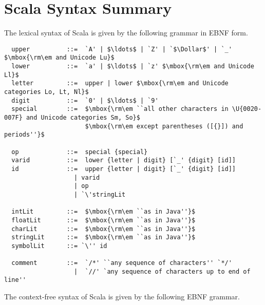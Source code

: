 \appendix
\chapter{Scala Syntax Summary}

The lexical syntax of Scala is given by the following grammar in EBNF
form.

\begin{lstlisting}
  upper          ::=  `A' | $\ldots$ | `Z' | `$\Dollar$' | `_' $\mbox{\rm\em and Unicode Lu}$
  lower          ::=  `a' | $\ldots$ | `z' $\mbox{\rm\em and Unicode Ll}$
  letter         ::=  upper | lower $\mbox{\rm\em and Unicode categories Lo, Lt, Nl}$
  digit          ::=  `0' | $\ldots$ | `9'
  special        ::=  $\mbox{\rm\em ``all other characters in \U{0020-007F} and Unicode categories Sm, So}$
                      $\mbox{\rm\em except parentheses ([{}]) and periods''}$

  op             ::=  special {special} 
  varid          ::=  lower {letter | digit} [`_' {digit} [id]]
  id             ::=  upper {letter | digit} [`_' {digit} [id]]
                   | varid
                   | op
                   | `\'stringLit

  intLit         ::=  $\mbox{\rm\em ``as in Java''}$
  floatLit       ::=  $\mbox{\rm\em ``as in Java''}$
  charLit        ::=  $\mbox{\rm\em ``as in Java''}$
  stringLit      ::=  $\mbox{\rm\em ``as in Java''}$
  symbolLit      ::= `\'' id

  comment        ::=  `/*' ``any sequence of characters'' `*/'
                   |  `//' `any sequence of characters up to end of line''
\end{lstlisting}

The context-free syntax of Scala is given by the following EBNF
grammar.

